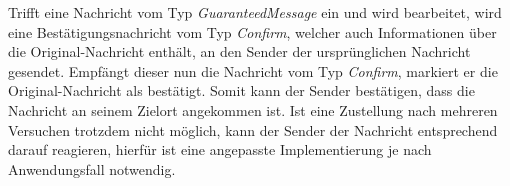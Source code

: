 % 
% 
Trifft eine Nachricht vom Typ \textit{GuaranteedMessage} ein und wird bearbeitet, wird eine Bestätigungsnachricht vom Typ \textit{Confirm}, welcher auch Informationen über die Original-Nachricht enthält, an den Sender der ursprünglichen Nachricht gesendet. Empfängt dieser nun die Nachricht vom Typ \textit{Confirm}, markiert er die Original-Nachricht als bestätigt. Somit kann der Sender bestätigen, dass die Nachricht an seinem Zielort angekommen ist. Ist eine Zustellung nach mehreren Versuchen trotzdem nicht möglich, kann der Sender der Nachricht entsprechend darauf reagieren, hierfür ist eine angepasste Implementierung je nach Anwendungsfall notwendig. \\
% 
% 

